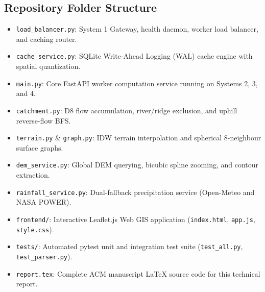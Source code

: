 \documentclass[manuscript,screen,review]{acmart}
\begin{document}
\subsection{Repository Folder Structure}
\begin{itemize}
    \item \texttt{load\_balancer.py}: System 1 Gateway, health daemon, worker load balancer, and caching router.
    \item \texttt{cache\_service.py}: SQLite Write-Ahead Logging (WAL) cache engine with spatial quantization.
    \item \texttt{main.py}: Core FastAPI worker computation service running on Systems 2, 3, and 4.
    \item \texttt{catchment.py}: D8 flow accumulation, river/ridge exclusion, and uphill reverse-flow BFS.
    \item \texttt{terrain.py} \& \texttt{graph.py}: IDW terrain interpolation and spherical 8-neighbour surface graphs.
    \item \texttt{dem\_service.py}: Global DEM querying, bicubic spline zooming, and contour extraction.
    \item \texttt{rainfall\_service.py}: Dual-fallback precipitation service (Open-Meteo and NASA POWER).
    \item \texttt{frontend/}: Interactive Leaflet.js Web GIS application (\texttt{index.html}, \texttt{app.js}, \texttt{style.css}).
    \item \texttt{tests/}: Automated pytest unit and integration test suite (\texttt{test\_all.py}, \texttt{test\_parser.py}).
    \item \texttt{report.tex}: Complete ACM manuscript LaTeX source code for this technical report.
\end{itemize}
\end{document}
